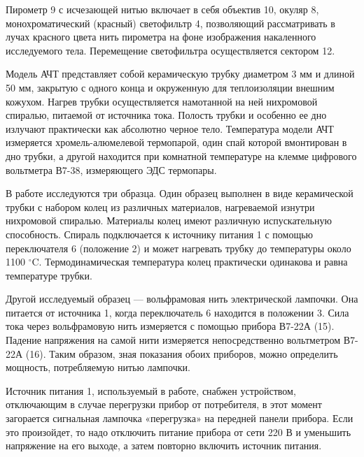 	Пирометр 9 с исчезающей нитью включает в себя объектив 10, окуляр 8, монохроматический (красный) светофильтр 4, позволяющий рассматривать в лучах красного цвета нить пирометра на фоне изображения накаленного исследуемого тела. Перемещение светофильтра осуществляется сектором 12.
	
	Модель АЧТ представляет собой керамическую трубку диаметром 3 мм и длиной 50 мм, закрытую с одного конца и окруженную для теплоизоляции внешним кожухом. Нагрев трубки осуществляется намотанной на ней нихромовой спиралью, питаемой от источника тока. Полость трубки и особенно ее дно излучают практически как абсолютно черное тело. Температура модели АЧТ измеряется хромель-алюмелевой термопарой, один спай которой вмонтирован в дно трубки, а другой находится при комнатной температуре на клемме цифрового вольтметра В7-38, измеряющего ЭДС термопары.

	
	В работе исследуются три образца. Один образец выполнен в виде керамической трубки с набором колец из различных материалов, нагреваемой изнутри нихромовой спиралью. Материалы колец имеют различную испускательную способность. Спираль подключается к источнику питания 1 с помощью переключателя 6 (положение 2) и может нагревать трубку до температуры около 1100 $^\circ$C. Термодинамическая температура колец практически одинакова и равна температуре трубки.

	
	Другой исследуемый образец — вольфрамовая нить электрической лампочки. Она питается от источника 1, когда переключатель 6 находится в положении 3. Сила тока через вольфрамовую нить измеряется с помощью прибора В7-22А (15). Падение напряжения на самой нити измеряется непосредственно вольтметром В7-22А (16). Таким образом, зная показания обоих приборов, можно определить мощность, потребляемую нитью лампочки.
	
	Источник питания 1, используемый в работе, снабжен устройством, отключающим в случае перегрузки прибор от потребителя, в этот момент загорается сигнальная лампочка «перегрузка» на передней панели прибора. Если это произойдет, то надо отключить питание прибора от сети 220 В и уменьшить напряжение на его выходе, а затем повторно включить источник питания.

	
	
